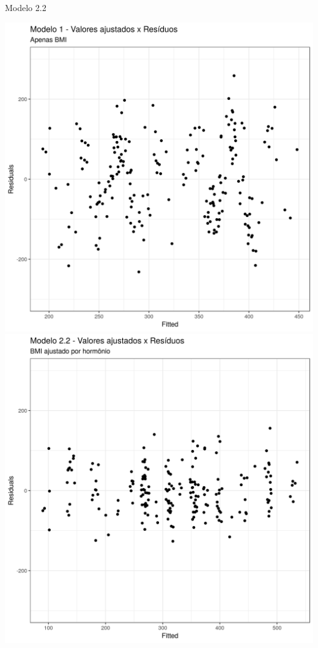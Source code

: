 \documentclass{beamer}
\begin{document}
\begin{frame}{\small Modelo 2.2}
  \begin{center}
    \includegraphics[height=.6\textheight]{Cap31-32/pratica-rlm1-resid}
    \includegraphics[height=.6\textheight]{Cap31-32/pratica-rlm2_2-resid}
  \end{center}
\end{frame}
\end{document}
